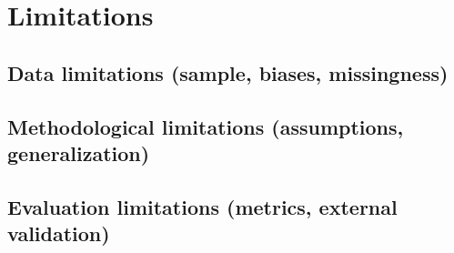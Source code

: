 \chapter{Limitations}\label{chap:limitations}

\section{Data limitations (sample, biases, missingness)}\label{sec:limitations-data}

\section{Methodological limitations (assumptions, generalization)}\label{sec:limitations-methods}

\section{Evaluation limitations (metrics, external validation)}\label{sec:limitations-evaluation}


